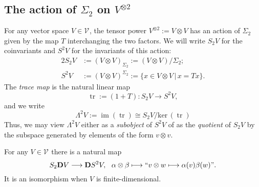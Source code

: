 \documentclass[11pt]{amsart} \renewcommand{\baselinestretch}{1.2}
\theoremstyle{plain}
\numberwithin{equation}{section} %
\theoremstyle{plain}
\numberwithin{equation}{chapter} %
\renewcommand{\ker}{\mathrm{ker}\,}
\DeclareMathOperator{\im}{im}
\DeclareMathOperator{\trace}{tr}
\renewcommand{\to}{\longrightarrow}
\newcommand{\calV}{\mathcal{V}}
\newcommand{\vect}[2]{\calV^{#1}_{#2}}
\newcommand{\dual}{\mathbf{D}}
\renewcommand{\mapsto}{\longmapsto}
\newcommand{\SubsectionOrSection}[1]{\subsection{#1}}
\begin{document}
\begin{Conventions and notation}
\SubsectionOrSection{The action of $\Sigma_2$ on $V^{\otimes 2}$}
For any vector space $V\in \vect{}{}$, the tensor power $V^{\otimes2}:=V\otimes V$ has an action of $\Sigma_2$ given by the map $T$ interchanging the two factors. We will write $S_2V$ for the coinvariants and $S^2V$ for the invariants of this action:
\begin{alignat*}{2}
S_2V
&:=(V\otimes V)_{\Sigma_2}:=
(V\otimes V)/\Sigma_2;%
\\
S^2V
&:=(V\otimes V)^{\Sigma_2}:=
\{x\in V\otimes V\,|\,x=Tx\}.
\end{alignat*}
The \emph{trace map}  is the natural linear map
\[\trace:=(1+T):S_2V\to S^2V,\]
and we write
\[\Lambda^2V:=\im(\trace)\cong S_2V/\ker(\trace)\]
Thus, we may view  $\Lambda^2V$ either as a \emph{subobject} of $S^2V$ of  as the \emph{quotient}  of $S_2V$ by the subspace generated by elements of the form $v\otimes v$. %

For any $V\in \vect{}{}$ there is a natural map
\[S_2\dual V\to \dual S^2V,\ \ \alpha\otimes \beta\mapsto\textup{``$v\otimes w\mapsto \alpha(v)\beta(w)$''}.\]
It is an isomorphism when $V$ is finite-dimensional.


\end{Conventions and notation}
\end{document}
